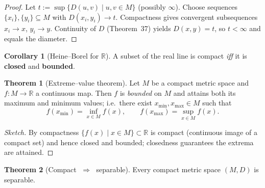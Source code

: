 \documentclass[12pt]{article}
\theoremstyle{definition} %
\newtheorem{theorem}{Theorem}
\newtheorem{corollary}{Corollary}
\theoremstyle{plain} %
\begin{document}
\begin{proof}
  Let $t:=\sup\{D(u,v)\mid u,v\in M\}$ (possibly $\infty$).
  Choose sequences $\{x_i\},\{y_i\}\subseteq M$
  with $D(x_i,y_i)\to t$.
  Compactness gives convergent subsequences
  $x_i\to x$, $y_i\to y$.
  Continuity of $D$ (Theorem 37) yields
  $D(x,y)=t$, so $t<\infty$ and equals the diameter.
\end{proof}

\begin{corollary}[Heine–Borel for $\mathbb R$]\label{cor:HB}
  A subset of the real line is compact \emph{iff} it is
  \textbf{closed} and \textbf{bounded}.
\end{corollary}

\begin{theorem}[Extreme–value theorem]\label{thm:EVT}
  Let $M$ be a compact metric space and
  $f:M\to\mathbb R$ a continuous map.
  Then $f$ is \emph{bounded} on $M$ and attains both its
  maximum and minimum values; i.e.\ there exist
  $x_{\min},x_{\max}\in M$ such that
  \[
      f(x_{\min})=\inf_{x\in M}f(x),
      \qquad
      f(x_{\max})=\sup_{x\in M}f(x).
  \]
\end{theorem}

\begin{proof}[Sketch]
  By compactness $\{f(x)\mid x\in M\}\subset\mathbb R$
  is compact (continuous image of a compact set) and hence closed and
  bounded; closedness guarantees the extrema are attained.
\end{proof}

\begin{theorem}[Compact $\;\Rightarrow\;$ separable]\label{thm:compact_sep}
  Every compact metric space $(M,D)$ is separable.
\end{theorem}
\end{document}
